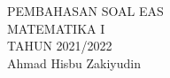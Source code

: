 \documentclass{article}
\begin{document}
 \begin{titlepage}
    \vspace*{\fill}
    \begin{center}
      \Huge {PEMBAHASAN SOAL EAS \\ MATEMATIKA I \\ TAHUN 2021/2022}\\[0.4 cm]
      \huge {Ahmad Hisbu Zakiyudin}
    \end{center}
    \vspace*{\fill}
  \end{titlepage}
\makeatletter
\renewcommand*\env@matrix[1][*\c@MaxMatrixCols c]{%
  \hskip -\arraycolsep
  \let\@ifnextchar\new@ifnextchar
  \array{#1}}
\makeatother
\newcount\arrowcount
\newcommand\arrows[1]{
        \global\arrowcount#1
        \ifnum\arrowcount>0
                \begin{matrix}[c]
                \expandafter\nextarrow
        \fi
}
 
\newcommand\nextarrow[1]{
        \global\advance\arrowcount-1
        \ifx\relax#1\relax\else \xrightarrow{#1}\fi
        \ifnum\arrowcount=0
                \end{matrix}
        \else
                \\
                \expandafter\nextarrow
        \fi
}
\newpage
{}
\end{document}
